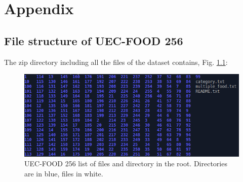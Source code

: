 %
%
\appendix

\chapter{Appendix}
\section{File structure of UEC-FOOD 256}

The zip directory including all the files of the dataset contains, Fig. \ref{fig:uec_file_tree}:

\begin{figure}[h]
    \centering
    \includegraphics[scale=0.5]{img/uec_file_tree.png}
    \caption[UEC-FOOD 256 list of files and directory in the root]{UEC-FOOD 256 list of files and directory in the root. Directories are in blue, files in white.}
    \label{fig:uec_file_tree}
\end{figure}

